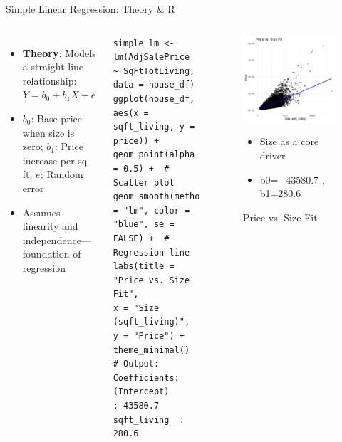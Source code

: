\documentclass{beamer}
\begin{document}
	\begin{frame}[fragile]{Simple Linear Regression: Theory \& R}
		\begin{columns}
			\begin{itemize}
				\item \textbf{Theory}: Models a straight-line relationship: $Y = b_0 + b_1X + e$
				\item $b_0$: Base price when size is zero; $b_1$: Price increase per sq ft; $e$: Random error
				\item Assumes linearity and independence—foundation of regression
			\end{itemize}
			\begin{lstlisting}
simple_lm <- lm(AdjSalePrice ~ SqFtTotLiving, data = house_df)
ggplot(house_df, aes(x = sqft_living, y = price)) +
geom_point(alpha = 0.5) +  # Scatter plot
geom_smooth(method = "lm", color = "blue", se = FALSE) +  # Regression line
labs(title = "Price vs. Size Fit",
x = "Size (sqft_living)",
y = "Price") +
theme_minimal()
# Output: Coefficients:
(Intercept) :-43580.7   sqft_living  : 280.6 
			\end{lstlisting}
		\begin{figure}
			\centering
			\includegraphics[width=\textwidth]{regres1.jpg} %
			\caption{Price vs. Size Fit}
			\label{fig:price_vs_size_fit}
			\begin{itemize}
				\item Size as a core driver
			\end{itemize}
			\begin{itemize}
				\item b0=−43580.7 , b1=280.6
			\end{itemize}
		\end{figure}
		\end{columns}
	\end{frame}
\end{document}
